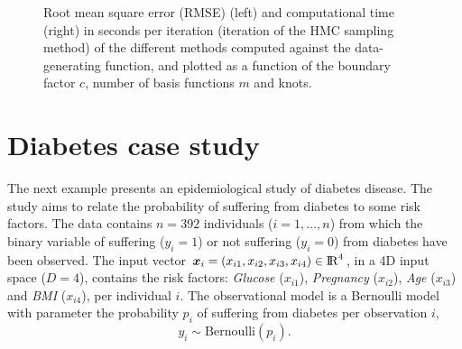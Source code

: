 \documentclass[onecolumn,a4paper,11pt]{article}
\begin{document}
\begin{figure}
\caption{Root mean square error (RMSE) (left) and computational time (right) in seconds per iteration (iteration of the HMC sampling method) of the different methods computed against the data-generating function, and plotted as a function of the boundary factor $c$, number of basis functions $m$ and knots.}
  \label{ch5_fig17_RMSE_exII}
\end{figure}


\section{Diabetes case study}\label{ch5_sec_bf_caseV}
The next example presents an epidemiological study of diabetes disease. The study aims to relate the probability of suffering from diabetes to some risk factors. The data contains $n=392$ individuals ($i=1,\dots,n$) from which the binary variable of suffering ($y_i=1$) or not suffering ($y_i=0$) from diabetes have been observed. The input vector $\bm{x}_i=(x_{i1},x_{i2},x_{i3},x_{i4}) \in {\rm I\!R}^{4}$, in a 4D input space ($D=4$), contains the risk factors: \textit{Glucose} ($x_{i1}$), \textit{Pregnancy} ($x_{i2}$), \textit{Age} ($x_{i3}$) and \textit{BMI} ($x_{i4}$), per individual $i$. The observational model is a Bernoulli model with parameter the probability $p_i$ of suffering from diabetes per observation $i$,
%
\begin{equation*}
y_i \sim \mathrm{Bernoulli}(p_i).
\end{equation*}
\end{document}
